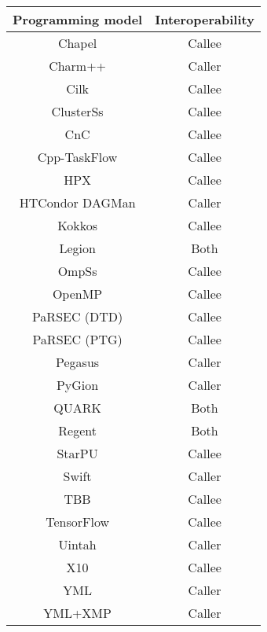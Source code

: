 \begin{tabular}{cc}
\hline
Programming model & Interoperability \\
\hline
Chapel & Callee\\
Charm++ & Caller\\
Cilk & Callee\\
ClusterSs & Callee\\
CnC & Callee\\
Cpp-TaskFlow & Callee\\
HPX & Callee\\
HTCondor DAGMan & Caller\\
Kokkos & Callee\\
Legion & Both\\
OmpSs & Callee\\
OpenMP & Callee\\
PaRSEC (DTD) & Callee\\
PaRSEC (PTG) & Callee\\
Pegasus & Caller\\
PyGion & Caller\\
QUARK & Both\\
Regent & Both\\
StarPU & Callee\\
Swift & Caller\\
TBB & Callee\\
TensorFlow & Callee\\
Uintah & Caller\\
X10 & Callee\\
YML & Caller\\
YML+XMP & Caller\\
\hline
\end{tabular}
